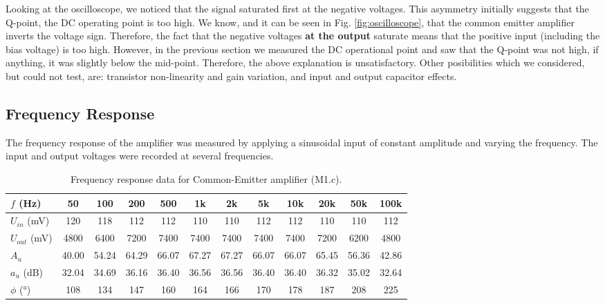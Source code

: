 \documentclass[12pt,a4paper]{article}
\begin{document}
Looking at the oscilloscope, we noticed that the signal saturated first at the negative voltages. This asymmetry initially suggests that the Q-point, the DC operating point is too high. We know, and it can be seen in Fig. \ref{fig:oscilloscope}, that the common emitter amplifier inverts the voltage sign. Therefore, the fact that the negative voltages \textbf{at the output} saturate means that the positive input (including the bias voltage) is too high. However, in the previous section we measured the DC operational point and saw that the Q-point was not high, if anything, it was slightly below the mid-point. Therefore, the above explanation is unsatisfactory. Other posibilities which we considered, but could not test, are: transistor non-linearity and gain variation, and input and output capacitor effects. 


\subsection{Frequency Response}
The frequency response of the amplifier was measured by applying a sinusoidal input of constant amplitude and varying the frequency. The input and output voltages were recorded at several frequencies.

\begin{table}[H]
    \centering
    \caption{Frequency response data for Common-Emitter amplifier (M1.c).}
    \label{tab:freq_response_m1}
    \begin{tabular}{lccccccccccc}
        \toprule
        {$f$ (\si{Hz})} & 50 & 100 & 200 & 500 & 1k & 2k & 5k & 10k & 20k & 50k & 100k \\
        \midrule
        {$U_{in}$ (\si{mV})} & 120 & 118 & 112 & 112 & 110 & 110 & 112 & 112 & 110 & 110 & 112 \\
        {$U_{out}$ (\si{mV})} & 4800 & 6400 & 7200 & 7400 & 7400 & 7400 & 7400 & 7400 & 7200 & 6200 & 4800 \\
        {$A_u$} & 40.00 & 54.24 & 64.29 & 66.07 & 67.27 & 67.27 & 66.07 & 66.07 & 65.45 & 56.36 & 42.86 \\
        {$a_u$ (\si{dB})} & 32.04 & 34.69 & 36.16 & 36.40 & 36.56 & 36.56 & 36.40 & 36.40 & 36.32 & 35.02 & 32.64 \\
        {$\phi$ (\si{\degree})} & 108 & 134 & 147 & 160 & 164 & 166 & 170 & 178 & 187 & 208 & 225 \\
        \bottomrule
    \end{tabular}
\end{table}
\end{document}
